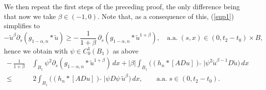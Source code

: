 \documentclass[10pt]{article}
\begin{document}
We then repeat the first steps of the preceding proof, the only
difference being that now we take $\beta\in (-1,0)$. Note that, as
a consequence of this, (\ref{sup1}) simplifies to
\[
-\tilde{u}^{\beta}\partial_{s}(g_{1-\alpha,n}\ast \tilde{u}) \ge
-\,\frac{1}{1+\beta}\,\partial_{s}
(g_{1-\alpha,n}\ast\tilde{u}^{1+\beta}),\quad
\mbox{a.a.}\;(s,x)\in (0,t_2-t_0)\times B,
\]
hence we obtain with $\psi\in C_0^1(B_1)$ as above
\begin{align}
-\,\frac{1}{1+\beta}\,& \int_{B_1}\psi^2\partial_{s}
(g_{1-\alpha,n}\ast\tilde{u}^{1+\beta})\,dx+|\beta|\int_{B_1}\big((h_n\ast
[ADu])\,\tilde{}\;|\psi^2 \tilde{u}^{\beta-1}D
\tilde{u}\big)\,dx \nonumber\\
\le  & \,2\int_{B_1}\big((h_n\ast [ADu])\,\tilde{}\;|\psi D\psi
\,\tilde{u}^{\beta}\big)\,dx,\quad\quad
\mbox{a.a.}\;s\in(0,t_2-t_0). \label{L1}
\end{align}
\end{document}
